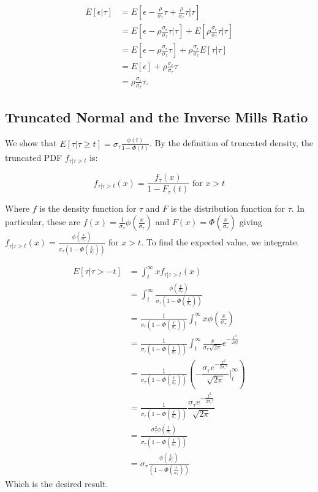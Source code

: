 \documentclass[12pt,twoside]{reedthesis}
\theoremstyle{definition}
\begin{document}
\begin{align*}
E[\epsilon | \tau] &= E[\epsilon - \frac{\rho}{\sigma_\tau} \tau +  \frac{\rho}{\sigma_\tau} \tau | \tau] \\
&= E[\epsilon - \rho \frac{\sigma_\epsilon}{\sigma_\tau} \tau | \tau] + E[\rho \frac{\sigma_\epsilon}{\sigma_\tau} \tau | \tau] \\
&= E[\epsilon - \rho \frac{\sigma_\epsilon}{\sigma_\tau} \tau] +\rho \frac{\sigma_\epsilon}{\sigma_\tau}E[\tau | \tau] \\
&= E[\epsilon] + \rho \frac{\sigma_\epsilon}{\sigma_\tau} \tau \\
&= \rho \frac{\sigma_\epsilon}{\sigma_\tau} \tau. 
\end{align*}

\subsection{Truncated Normal and the Inverse Mills Ratio}

We show that $E[\tau | \tau \geq t] = \sigma_\tau \frac{\phi(t)}{1 - \Phi(t)}$. By the definition of truncated density, the truncated PDF $f_{\tau | \tau > t}$ is:

$$f_{\tau | \tau > t}(x) = \frac{f_\tau(x)}{1 - F_\tau(t)} \text{  for } x > t$$

Where $f$ is the density function for $\tau$ and $F$ is the distribution function for $\tau$. In particular, these are $f(x) = \frac{1}{\sigma_\tau} \phi(\frac{x}{\sigma_\tau})$ and $F(x) = \Phi(\frac{x}{\sigma_\tau})$ giving $f_{\tau | \tau > t}(x) = \frac{\phi(\frac{x}{\sigma_\tau})}{\sigma_\tau(1 - \Phi(\frac{t}{\sigma_\tau}))} \text{  for } x > t$. To find the expected value, we integrate. 

\begin{align*}
E[\tau | \tau > - t] &= \int_t^\infty x f_{\tau | \tau > t}(x) \\
&= \int_t^\infty \frac{\phi(\frac{x}{\sigma_\tau})}{\sigma_\tau(1 - \Phi(\frac{t}{\sigma_\tau}))} \\
&= \frac{1}{\sigma_\tau(1 - \Phi(\frac{t}{\sigma_\tau}))} \int_t^\infty x \phi(\frac{x}{\sigma_\tau})  \\
&= \frac{1}{\sigma_\tau(1 - \Phi(\frac{t}{\sigma_\tau}))} \int_t^\infty  \frac{x}{\sigma_\tau \sqrt{2 \pi}}e^{-\frac{x^2}{2 \sigma_\tau^2}} \\
&= \frac{1}{\sigma_\tau(1 - \Phi(\frac{t}{\sigma_\tau}))} \left( -\dfrac{{\sigma_\tau}e^{-\frac{x^2}{2{\sigma_\tau}^2}}}{\sqrt{{2\pi}}} \bigg |_t^\infty \right) \\
&= \frac{1}{\sigma_\tau(1 - \Phi(\frac{t}{\sigma_\tau}))} \dfrac{{\sigma_\tau}e^{-\frac{t^2}{2{\sigma_\tau}^2}}}{\sqrt{{2\pi}}}  \\
&= \frac{\sigma_\tau^2 \phi(\frac{t}{\sigma_\tau})}{\sigma_\tau(1 - \Phi(\frac{t}{\sigma_\tau}))} \\
&= \sigma_\tau  \frac{\phi(\frac{t}{\sigma_\tau})}{(1 - \Phi(\frac{t}{\sigma_\tau}))} 
\end{align*}
Which is the desired result.


\end{document}
